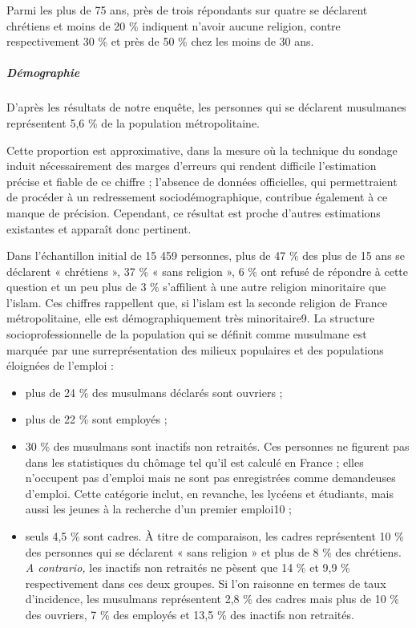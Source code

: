 Parmi les plus de 75 ans, près de trois répondants sur quatre se
déclarent chrétiens et moins de 20 \% indiquent n'avoir aucune religion,
contre respectivement 30 \% et près de 50 \% chez les moins de 30 ans.


\hypertarget{duxe9mographie}{%
\subparagraph{Démographie}\label{duxe9mographie}}


D'après les résultats de notre enquête, les personnes qui se déclarent
musulmanes représentent 5,6 \% de la population métropolitaine.

Cette proportion est approximative, dans la mesure où la technique du
sondage induit nécessairement des marges d'erreurs qui rendent difficile
l'estimation précise et fiable de ce chiffre ; l'absence de données
officielles, qui permettraient de procéder à un redressement
sociodémographique, contribue également à ce manque de
précision. Cependant, ce résultat est proche d'autres estimations
existantes et apparaît donc pertinent.

Dans l'échantillon initial de 15 459 personnes, plus de 47 \% des plus
de 15 ans se déclarent « chrétiens », 37 \% « sans religion », 6 \% ont
refusé de répondre à cette question et un peu plus de 3 \% s'affilient à
une autre religion minoritaire que l'islam. Ces chiffres rappellent que,
si l'islam est la seconde religion de France métropolitaine, elle est
démographiquement très minoritaire9. La structure socioprofessionnelle
de la population qui se définit comme musulmane est marquée par une
surreprésentation des milieux populaires et des populations éloignées de
l'emploi :


\begin{itemize}
\item
  
  plus de 24 \% des musulmans déclarés sont ouvriers ;
  
\item
  
  plus de 22 \% sont employés ;
  
\item
  
  30 \% des musulmans sont inactifs non retraités. Ces personnes ne
  figurent pas dans les statistiques du chômage tel qu'il est calculé en
  France ; elles n'occupent pas d'emploi mais ne sont pas enregistrées
  comme demandeuses d'emploi. Cette catégorie inclut, en revanche, les
  lycéens et étudiants, mais aussi les jeunes à la recherche d'un
  premier emploi10 ;
  
\item
  
  seuls 4,5 \% sont cadres. À titre de comparaison, les cadres
  représentent 10 \% des personnes qui se déclarent « sans religion » et
  plus de 8 \% des chrétiens. \emph{A contrario,} les inactifs non
  retraités ne pèsent que 14 \% et 9,9 \% respectivement dans ces deux
  groupes. Si l'on raisonne en termes de taux d'incidence, les musulmans
  représentent 2,8 \% des cadres mais plus de 10 \% des ouvriers, 7 \%
  des employés et 13,5 \% des inactifs non retraités.
  
\end{itemize}


